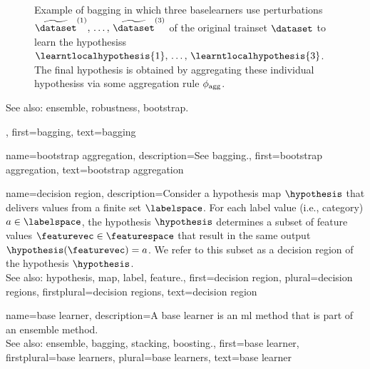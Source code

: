 {{\begin{figure}[H]
\begin{center}
		\caption{Example of bagging in which three \glspl{baselearner} use perturbations  
			$\widetilde{\dataset}^{(1)},\,\ldots,\,\widetilde{\dataset}^{(3)}$ of 
			the original \gls{trainset} $\dataset$ to learn the \glspl{hypothesis} 
			$\learntlocalhypothesis{1},\,\ldots,\,\learntlocalhypothesis{3}$. The final 
			\gls{hypothesis} is obtained by aggregating these individual \glspl{hypothesis} 
			via some aggregation rule $\phi_{\rm agg}$.}
			\end{center}
		\end{figure}
		See also: \gls{ensemble}, \gls{robustness}, \gls{bootstrap}.},
	first={bagging},
	text={bagging}
}

{name={bootstrap aggregation}, 
	description={See \gls{bagging}.},
 	first={bootstrap aggregation},
 	text={bootstrap aggregation} 
}	

{name={decision region},
	description={Consider 
		a \gls{hypothesis} \gls{map} $\hypothesis$ that delivers values from a finite set $\labelspace$. 
		For each \gls{label} value (i.e., category) $a \in \labelspace$, the \gls{hypothesis} $\hypothesis$ 
		determines a subset of \gls{feature} values $\featurevec \in \featurespace$ that result 
		in the same \gls{output} $\hypothesis(\featurevec)=a$. We refer to this subset as a decision 
		region of the \gls{hypothesis} $\hypothesis$. 
		\\
		See also: \gls{hypothesis}, \gls{map}, \gls{label}, \gls{feature}.},
	first={decision region},
	plural={decision regions}, 
	firstplural={decision regions}, 
	text={decision region} 
}

{name={base learner}, 
	description={A base learner is an \gls{ml} method 
         	that is part of an \gls{ensemble} method. 
		\\
		See also: \gls{ensemble}, \gls{bagging}, \gls{stacking}, \gls{boosting}.},
	first={base learner},
	firstplural={base learners},
	plural={base learners},
	text={base learner} 
}	

